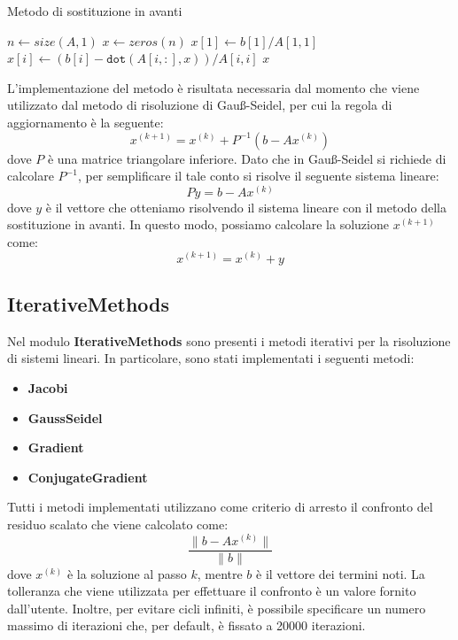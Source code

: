 \begin{algorithm}
    \caption{Metodo di sostituzione in avanti}\label{alg:cap}
    \begin{algorithmic}
        \State $n \gets size(A, 1)$
        \State $x \gets zeros(n)$
        \State $x[1] \gets b[1] / A[1, 1]$
        \State $x[i] \gets (b[i] - \texttt{dot}(A[i, :], x)) / A[i, i]$
        \EndFor
        \State \Return $x$
        \EndFunction
    \end{algorithmic}
\end{algorithm}
L'implementazione del metodo è risultata necessaria dal momento che viene
utilizzato dal metodo di risoluzione di Gauß-Seidel, per cui la regola di
aggiornamento è la seguente:
\begin{equation}
    x^{(k+1)} = x^{(k)} + P^{-1}(b - Ax^{(k)})
\end{equation}
dove $P$ è una matrice triangolare inferiore. Dato che in Gauß-Seidel si richiede
di calcolare $P^{-1}$, per semplificare il tale conto si risolve il seguente sistema
lineare:
\begin{equation}
    Py = b - Ax^{(k)}
\end{equation}
dove $y$ è il vettore che otteniamo risolvendo il sistema lineare con il metodo
della sostituzione in avanti. In questo modo, possiamo calcolare la soluzione
$x^{(k+1)}$ come:
\begin{equation}
    x^{(k+1)} = x^{(k)} + y
\end{equation}
\subsection{IterativeMethods}
Nel modulo \textbf{IterativeMethods} sono presenti i metodi iterativi per la
risoluzione di sistemi lineari. In particolare, sono stati implementati i seguenti
metodi:
\begin{itemize}
    \item \textbf{Jacobi}
    \item \textbf{GaussSeidel}
    \item \textbf{Gradient}
    \item \textbf{ConjugateGradient}
\end{itemize}

Tutti i metodi implementati utilizzano come criterio di arresto il confronto del
residuo scalato che viene calcolato come:
\begin{equation}
    \frac{\|b - Ax^{(k)}\|}{\|b\|}
\end{equation}
dove $x^{(k)}$ è la soluzione al passo $k$, mentre $b$ è il vettore dei termini
noti. La tolleranza che viene utilizzata per effettuare il confronto è un valore
fornito dall'utente. Inoltre, per evitare cicli infiniti, è possibile specificare
un numero massimo di iterazioni che, per default, è fissato a 20000 iterazioni.

